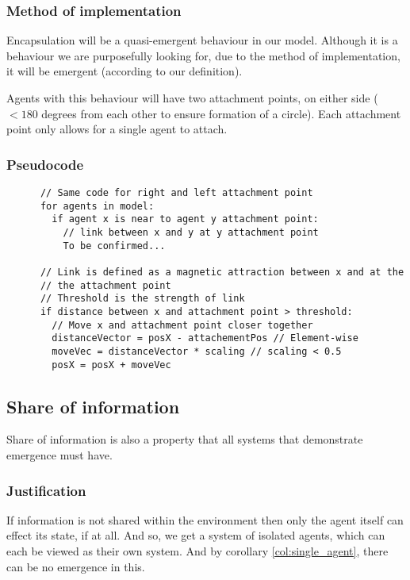 \documentclass{article}
\begin{document}
    \subsubsection{Method of implementation}
      
      Encapsulation will be a quasi-emergent behaviour in our model. Although it is a behaviour we are purposefully looking for, due to the method of implementation, it will be emergent (according to our definition).

      Agents with this behaviour will have two attachment points, on either side ($<180$ degrees from each other to ensure formation of a circle). Each attachment point only allows for a single agent to attach.

    \subsubsection{Pseudocode}

      \begin{verbatim}
      // Same code for right and left attachment point
      for agents in model:
        if agent x is near to agent y attachment point:
          // link between x and y at y attachment point
          To be confirmed... 

      // Link is defined as a magnetic attraction between x and at the
      // the attachment point
      // Threshold is the strength of link
      if distance between x and attachment point > threshold:
        // Move x and attachment point closer together
        distanceVector = posX - attachementPos // Element-wise 
        moveVec = distanceVector * scaling // scaling < 0.5
        posX = posX + moveVec
      \end{verbatim}


  \subsection{Share of information}
  
    Share of information is also a property that all systems that demonstrate emergence must have. 

    \subsubsection{Justification}
      
    If information is not shared within the environment then only the agent itself can effect its state, if at all. And so, we get a system of isolated agents, which can each be viewed as their own system. And by corollary \ref{col:single_agent}, there can be no emergence in this.
\end{document}
